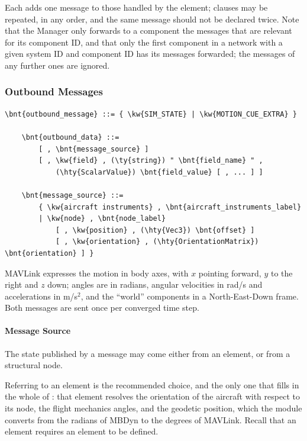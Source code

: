 Each  adds one message to those handled by the element;
clauses may be repeated, in any order, and the same message should not be
declared twice.
Note that the Manager only forwards to a component the messages that are
relevant for its component ID, and that only the first component in a
network with a given system ID and component ID has its messages forwarded;
the messages of any further ones are ignored.

\subsubsection{Outbound Messages}

\begin{Verbatim}[commandchars=\\\{\}]
    \bnt{outbound_message} ::= { \kw{SIM_STATE} | \kw{MOTION_CUE_EXTRA} }

    \bnt{outbound_data} ::=
        [ , \bnt{message_source} ]
        [ , \kw{field} , (\ty{string}) " \bnt{field_name} " ,
            (\hty{ScalarValue}) \bnt{field_value} [ , ... ] ]

    \bnt{message_source} ::=
        { \kw{aircraft instruments} , \bnt{aircraft_instruments_label}
        | \kw{node} , \bnt{node_label}
            [ , \kw{position} , (\hty{Vec3}) \bnt{offset} ]
            [ , \kw{orientation} , (\hty{OrientationMatrix}) \bnt{orientation} ] }
\end{Verbatim}

MAVLink expresses the motion in body axes, with $x$ pointing forward, $y$ to
the right and $z$ down; angles are in radians, angular velocities in rad/s
and accelerations in m/s$^2$, and the ``world'' components in a
North-East-Down frame.
Both messages are sent once per converged time step.

\paragraph{Message Source}
The state published by a message may come either from an
element, or from a structural node.

Referring to an  element is the recommended choice,
and the only one that fills in the whole of : that element
resolves the orientation of the aircraft with respect to its node,
the flight mechanics angles, and the geodetic position, which the module
converts from the radians of MBDyn to the degrees of MAVLink.
Recall that an  element requires an
 element to be defined.

